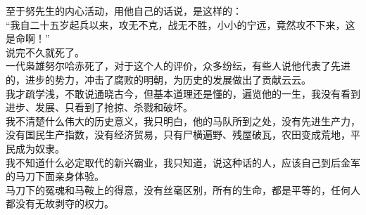 \begin{multicols}{\theparacolNo}
至于努先生的内心活动，用他自己的话说，是这样的：\\

“我自二十五岁起兵以来，攻无不克，战无不胜，小小的宁远，竟然攻不下来，这是命啊！”\\

说完不久就死了。\\

一代枭雄努尔哈赤死了，对于这个人的评价，众多纷纭，有些人说他代表了先进的，进步的势力，冲击了腐败的明朝，为历史的发展做出了贡献云云。\\

我才疏学浅，不敢说通晓古今，但基本道理还是懂的，遍览他的一生，我没有看到进步、发展、只看到了抢掠、杀戮和破坏。\\

我不清楚什么伟大的历史意义，我只明白，他的马队所到之处，没有先进生产力，没有国民生产指数，没有经济贸易，只有尸横遍野、残屋破瓦，农田变成荒地，平民成为奴隶。\\

我不知道什么必定取代的新兴霸业，我只知道，说这种话的人，应该自己到后金军的马刀下面亲身体验。\\

马刀下的冤魂和马鞍上的得意，没有丝毫区别，所有的生命，都是平等的，任何人都没有无故剥夺的权力。\\
\ifnum{}
	\end{multicols}
\fi